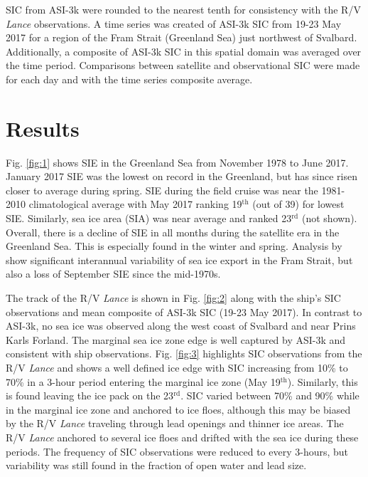 \documentclass[draft,linenumbers]{agujournal}
\begin{document}
SIC from ASI-3k were rounded to the nearest tenth for consistency with the R/V \textit{Lance} observations. A time series was created of ASI-3k SIC from 19-23 May 2017 for a region of the Fram Strait (Greenland Sea) just northwest of Svalbard. Additionally, a composite of ASI-3k SIC in this spatial domain was averaged over the time period. Comparisons between satellite and observational SIC were made for each day and with the time series composite average.


\section{Results}
\label{sec:3}
Fig. \ref{fig:1} shows SIE in the Greenland Sea from November 1978 to June 2017. January 2017 SIE was the lowest on record in the Greenland, but has since risen closer to average during spring. SIE during the field cruise was near the 1981-2010 climatological average with May 2017 ranking 19$^{\text{th}}$ (out of 39) for lowest SIE. Similarly, sea ice area (SIA) was near average and ranked 23$^{\text{rd}}$ (not shown). Overall, there is a decline of SIE in all months during the satellite era in the Greenland Sea. This is especially found in the winter and spring. Analysis by \citet{Smedsrud2017} show significant interannual variability of sea ice export in the Fram Strait, but also a loss of September SIE since the mid-1970s.

The track of the R/V \textit{Lance} is shown in Fig. \ref{fig:2} along with the ship's SIC observations and mean composite of ASI-3k SIC (19-23 May 2017). In contrast to ASI-3k, no sea ice was observed along the west coast of Svalbard and near Prins Karls Forland. The marginal sea ice zone edge is well captured by ASI-3k and consistent with ship observations. Fig. \ref{fig:3} highlights SIC observations from the R/V \textit{Lance} and shows a well defined ice edge with SIC increasing from 10\% to 70\% in a 3-hour period entering the marginal ice zone (May 19$^\text{th}$). Similarly, this is found leaving the ice pack on the 23$^\text{rd}$. SIC varied between 70\% and 90\% while in the marginal ice zone and anchored to ice floes, although this may be biased by the R/V \textit{Lance} traveling through lead openings and thinner ice areas. The R/V \textit{Lance} anchored to several ice floes and drifted with the sea ice during these periods. The frequency of SIC observations were reduced to every 3-hours, but variability was still found in the fraction of open water and lead size.
\end{document}
